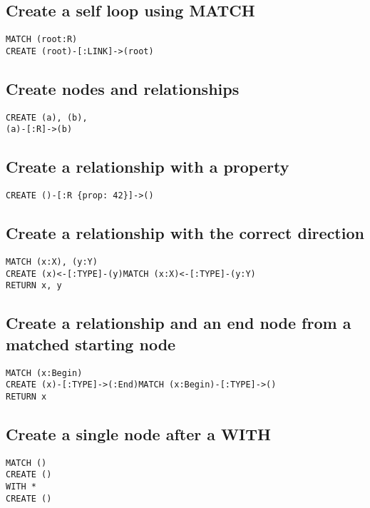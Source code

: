 \subsection{Create a self loop using MATCH}

\begin{lstlisting}
MATCH (root:R)
CREATE (root)-[:LINK]->(root)
\end{lstlisting}

\subsection{Create nodes and relationships}

\begin{lstlisting}
CREATE (a), (b),
(a)-[:R]->(b)
\end{lstlisting}

\subsection{Create a relationship with a property}

\begin{lstlisting}
CREATE ()-[:R {prop: 42}]->()
\end{lstlisting}

\subsection{Create a relationship with the correct direction}

\begin{lstlisting}
MATCH (x:X), (y:Y)
CREATE (x)<-[:TYPE]-(y)MATCH (x:X)<-[:TYPE]-(y:Y)
RETURN x, y
\end{lstlisting}

\subsection{Create a relationship and an end node from a matched starting node}

\begin{lstlisting}
MATCH (x:Begin)
CREATE (x)-[:TYPE]->(:End)MATCH (x:Begin)-[:TYPE]->()
RETURN x
\end{lstlisting}

\subsection{Create a single node after a WITH}

\begin{lstlisting}
MATCH ()
CREATE ()
WITH *
CREATE ()
\end{lstlisting}

